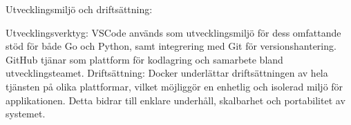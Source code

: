 Utvecklingsmiljö och driftsättning:

Utvecklingsverktyg: VSCode används som utvecklingsmiljö för dess omfattande stöd för både Go och Python, samt integrering med Git för versionshantering. GitHub tjänar som plattform för kodlagring och samarbete bland utvecklingsteamet.
Driftsättning: Docker underlättar driftsättningen av hela tjänsten på olika plattformar, vilket möjliggör en enhetlig och isolerad miljö för applikationen. Detta bidrar till enklare underhåll, skalbarhet och portabilitet av systemet.
